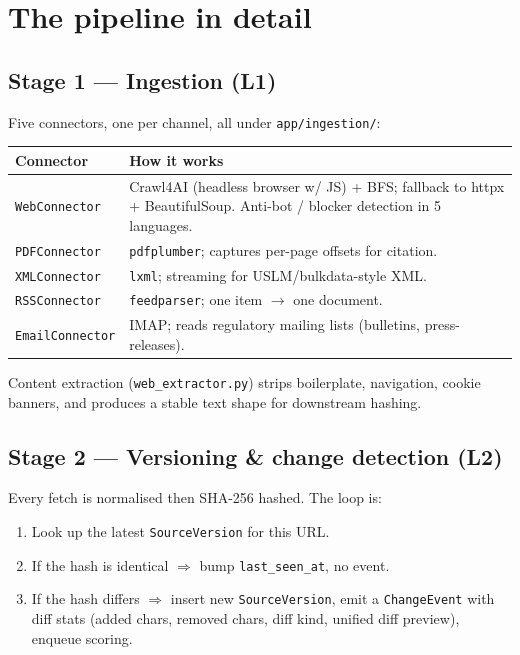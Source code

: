 \documentclass[11pt,a4paper]{article}
\begin{document}
\section{The pipeline in detail}

\subsection{Stage 1 --- Ingestion (L1)}

Five connectors, one per channel, all under \texttt{app/ingestion/}:

\begin{center}
\small
\begin{tabularx}{\linewidth}{@{}lX@{}}
\toprule
\textbf{Connector} & \textbf{How it works} \\
\midrule
\texttt{WebConnector}   & Crawl4AI (headless browser w/ JS) + BFS; fallback to httpx + BeautifulSoup. Anti-bot / blocker detection in 5 languages. \\
\texttt{PDFConnector}   & \texttt{pdfplumber}; captures per-page offsets for citation. \\
\texttt{XMLConnector}   & \texttt{lxml}; streaming for USLM/bulkdata-style XML. \\
\texttt{RSSConnector}   & \texttt{feedparser}; one item $\to$ one document. \\
\texttt{EmailConnector} & IMAP; reads regulatory mailing lists (bulletins, press-releases). \\
\bottomrule
\end{tabularx}
\end{center}

Content extraction (\texttt{web\_extractor.py}) strips boilerplate,
navigation, cookie banners, and produces a stable text shape for
downstream hashing.

\subsection{Stage 2 --- Versioning \& change detection (L2)}

Every fetch is normalised then SHA-256 hashed. The loop is:

\begin{enumerate}[leftmargin=1.4em,itemsep=2pt]
  \item Look up the latest \texttt{SourceVersion} for this URL.
  \item If the hash is identical $\Rightarrow$ bump \texttt{last\_seen\_at},
        no event.
  \item If the hash differs $\Rightarrow$ insert new \texttt{SourceVersion},
        emit a \texttt{ChangeEvent} with diff stats (added chars, removed
        chars, diff kind, unified diff preview), enqueue scoring.
\end{enumerate}
\end{document}
